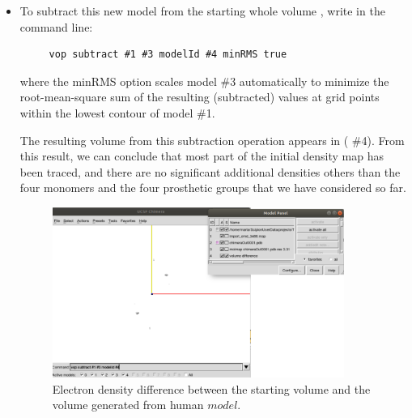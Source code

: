 \begin{itemize}
\begin{itemize}
  \item To subtract this new model from the starting whole volume , write in \chimera the command line:
  
  \begin{verbatim}
     vop subtract #1 #3 modelId #4 minRMS true
  \end{verbatim}
  where the minRMS option scales model \#3 automatically to minimize the root-mean-square sum of the resulting (subtracted) values at grid points within the lowest contour of model \#1.
  
  The resulting volume from this subtraction operation appears in  ( \#4). From this result, we can conclude that most part of the initial density map has been traced, and there are no significant additional densities others than the four monomers and the four prosthetic groups that we have considered so far.
  
  \begin{figure}[H]
    \centering 
    \captionsetup{width=.7\linewidth} 
    \includegraphics[width=0.90\textwidth]{Images/Fig44}
    \caption{Electron density difference between the starting volume  and the volume generated from human  $model$.}
    \label{fig:chimera_operate_vol_3}
   \end{figure}
  
  
  \end{itemize}
 
\end{itemize}
